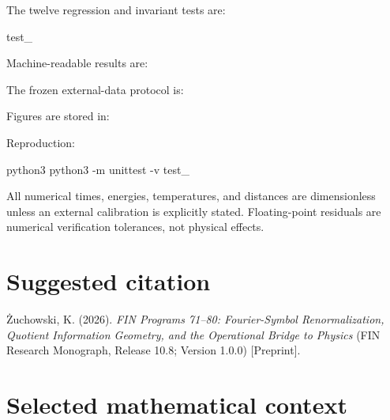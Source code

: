 \documentclass[11pt,a4paper,openany]{report}
\begin{document}

The twelve regression and invariant tests are:

test\_

Machine-readable results are:


The frozen external-data protocol is:


Figures are stored in:


Reproduction:

python3  python3 -m unittest -v test\_

All numerical times, energies, temperatures, and distances are dimensionless unless an external calibration is explicitly stated. Floating-point residuals are numerical verification tolerances, not physical effects.

\section{Suggested citation}

\.Zuchowski, K. (2026). \emph{FIN Programs 71--80: Fourier-Symbol Renormalization, Quotient Information Geometry, and the Operational Bridge to Physics} (FIN Research Monograph, Release 10.8; Version 1.0.0) [Preprint].

\section{Selected mathematical context}
\end{document}
